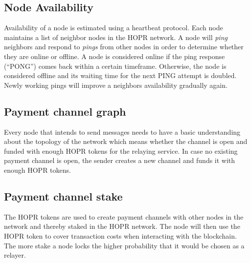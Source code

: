 \subsection{Node Availability}
\label{sec:nodeavailability}

Availability of a node is estimated using a heartbeat protocol. Each node maintains a
list of neighbor nodes in the HOPR network. A node will \textit{ping} neighbors and
respond to \textit{pings} from other nodes in order to determine whether they are online or offline.
A node is considered online if the ping response (“PONG”) comes back within a
certain timeframe. Otherwise, the node is considered offline and its waiting
time for the next PING attempt is doubled. Newly working pings will improve a
neighbors availability gradually again.

\subsection{Payment channel graph}

Every node that intends to send messages needs to have a basic understanding
about the topology of the network which means whether the channel is open and
funded with enough HOPR tokens for the relaying service. In case no existing
payment channel is open, the sender creates a new channel and funds it with
enough HOPR tokens.

\subsection{Payment channel stake}

The HOPR tokens are used to create payment channels with other nodes in the
network and thereby staked in the HOPR network. The node will then use the HOPR
token to cover transaction costs when interacting with the blockchain. The more
stake a node locks the higher probability that it would be chosen as a relayer.
